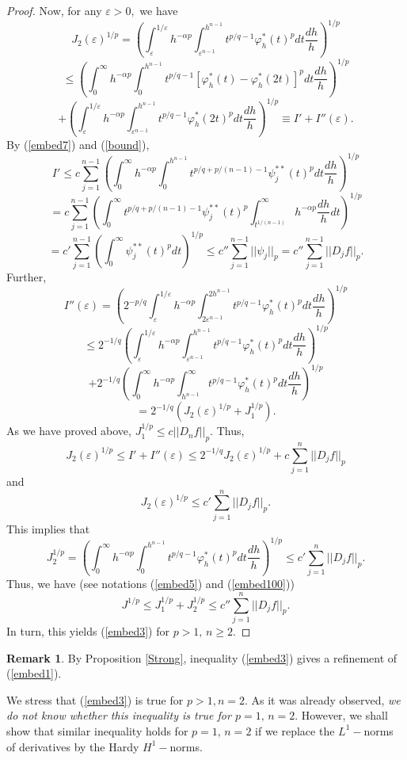 \documentclass[12pt,twoside,reqno]{amsart}
\numberwithin{equation}{section}
\theoremstyle{definition}
\newtheorem{rem}[teo]{Remark}
\numberwithin{equation}{section}
\def\a{\alpha}
\def\e{\varepsilon}
\def\f{\varphi}
\begin{document}
\begin{proof}
Now, for any $\e>0,$ we have
$$
J_2(\e)^{1/p}= \left(\int_\e^{1/\e} h^{-\a p}\int_{\e^{n-1}}^{h^{n-1}}t^{p/q-1}\f_h^*(t)^pdt\frac{dh}{h}\right)^{1/p}
$$
$$
\le \left(\int_0^\infty h^{-\a p}\int_0^{h^{n-1}}t^{p/q-1}[\f_h^*(t)-\f_h^*(2t)]^pdt\frac{dh}{h}\right)^{1/p}
$$
$$
+\left(\int_\e^{1/\e} h^{-\a p}\int_{\e^{n-1}}^{h^{n-1}}t^{p/q-1}\f_h^*(2t)^pdt\frac{dh}{h}\right)^{1/p}\equiv I'+I''(\e).
$$
By (\ref{embed7}) and (\ref{bound}),
$$
I'\le c\sum_{j=1}^{n-1}\left(\int_0^\infty h^{-\a p}\int_0^{h^{n-1}}t^{p/q+p/(n-1)-1}\psi^{**}_j(t)^pdt\frac{dh}{h}\right)^{1/p}
$$
$$
=c\sum_{j=1}^{n-1}\left(\int_0^\infty t^{p/q+p/(n-1)-1}\psi^{**}_j(t)^p\int_{t^{1/(n-1)}}^\infty h^{-\a p}\frac{dh}{h}dt\right)^{1/p}
$$
$$
=c'\sum_{j=1}^{n-1}\left(\int_0^\infty\psi^{**}_j(t)^p dt\right)^{1/p}\le c''\sum_{j=1}^{n-1}||\psi_j||_p=c''\sum_{j=1}^{n-1}||D_jf||_p.
$$
Further,
$$
I''(\e)=\left(2^{-p/q}\int_\e^{1/\e} h^{-\a p}\int_{2\e^{n-1}}^{2h^{n-1}}t^{p/q-1}\f_h^*(t)^pdt\frac{dh}{h}\right)^{1/p}
$$
$$
\le 2^{-1/q}\left(\int_\e^{1/\e} h^{-\a p}\int_{\e^{n-1}}^{h^{n-1}}t^{p/q-1}\f_h^*(t)^pdt\frac{dh}{h}\right)^{1/p}
$$
$$
+2^{-1/q}\left(\int_0^\infty h^{-\a p}\int_{h^{n-1}}^\infty t^{p/q-1}\f_h^*(t)^pdt\frac{dh}{h}\right)^{1/p}
$$
$$
=2^{-1/q}\left(J_2(\e)^{1/p}+J_1^{1/p}\right).
$$
As we have proved above, $J_1^{1/p}\le c ||D_nf||_p$. Thus,
$$
J_2(\e)^{1/p}\le I'+I''(\e)\le 2^{-1/q}J_2(\e)^{1/p}+ c\sum_{j=1}^{n}||D_jf||_p
$$
and
$$
J_2(\e)^{1/p}\le c'\sum_{j=1}^{n}||D_jf||_p.
$$
This implies that
$$
J_2^{1/p}=\left(\int_0^\infty h^{-\a p}\int_0^{h^{n-1}}t^{p/q-1}\f_h^*(t)^pdt\frac{dh}{h}\right)^{1/p}\le c'\sum_{j=1}^{n}||D_jf||_p.
$$
Thus, we have (see notations (\ref{embed5}) and (\ref{embed100}))
$$
J^{1/p}\le J_1^{1/p}+J_2^{1/p}\le c''\sum_{j=1}^{n}||D_jf||_p.
$$
In turn, this yields (\ref{embed3}) for $p>1,\,n\ge 2.$
\end{proof}

\begin{rem} By Proposition \ref{Strong}, inequality (\ref{embed3}) gives a refinement of (\ref{embed1}).

We stress that (\ref{embed3})  is true  for $p>1, n=2$. As it was already observed,  {\it we do not know whether this inequality  is true for $p=1, \,n=2.$} However, we shall show that similar  inequality holds for $p=1, \,n=2$ if we replace
the $L^1-$norms of derivatives  by the Hardy $H^1-$norms.
\end{rem}

\vskip 6pt


\vskip 6pt
\end{document}
